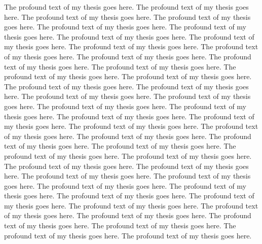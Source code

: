 The profound text of my thesis goes here. The profound text of my thesis
goes here. The profound text of my thesis goes here. The profound text of my
thesis goes here. The profound text of my thesis goes here. The profound
text of my thesis goes here. The profound text of my thesis goes here. The
profound text of my thesis goes here. The profound text of my thesis goes
here. The profound text of my thesis goes here. The profound text of my
thesis goes here. The profound text of my thesis goes here. The profound
text of my thesis goes here. The profound text of my thesis goes here. The
profound text of my thesis goes here. The profound text of my thesis goes
here. The profound text of my thesis goes here. The profound text of my
thesis goes here. The profound text of my thesis goes here. The profound
text of my thesis goes here. The profound text of my thesis goes here. The
profound text of my thesis goes here. The profound text of my thesis goes
here. The profound text of my thesis goes here. The profound text of my
thesis goes here. The profound text of my thesis goes here. The profound
text of my thesis goes here. The profound text of my thesis goes here. The
profound text of my thesis goes here. The profound text of my thesis goes
here. The profound text of my thesis goes here. The profound text of my
thesis goes here. The profound text of my thesis goes here. The profound
text of my thesis goes here. The profound text of my thesis goes here. The
profound text of my thesis goes here. The profound text of my thesis goes
here. The profound text of my thesis goes here. The profound text of my
thesis goes here. The profound text of my thesis goes here. The profound
text of my thesis goes here. The profound text of my thesis goes here. The
profound text of my thesis goes here. The profound text of my thesis goes
here. The profound text of my thesis goes here.
